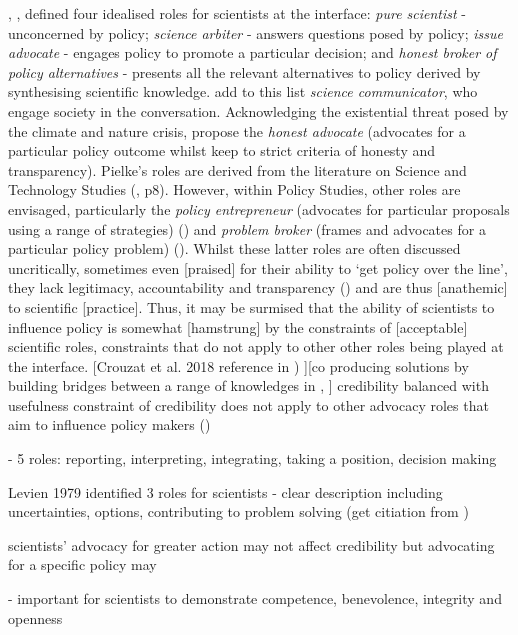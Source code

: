 , \textcite{Pielke2007}, defined four idealised roles for scientists at the interface: \emph{pure scientist} - unconcerned by policy; \emph{science arbiter} - answers questions posed by policy; \emph{issue advocate} - engages policy to promote a particular decision; and \emph{honest broker of policy alternatives} - presents all the relevant alternatives to policy derived by synthesising scientific knowledge. \textcite{RapleyD2014} add to this list \emph{science communicator}, who engage society in the conversation. Acknowledging the existential threat posed by the climate and nature crisis, \textcite{GregoryBW2024} propose the \emph{honest advocate} (advocates for a particular policy outcome whilst keep to strict criteria of honesty and transparency).  Pielke's roles are derived from the literature on Science and Technology Studies (\cite{Pielke2007}, p8). However, within Policy Studies, other roles are envisaged, particularly the \emph{policy entrepreneur} (advocates for particular proposals using a range of strategies) (\cite{Kingdon1993,Cairney2018}) and \emph{problem broker} (frames and advocates for a particular policy problem) (\cite{Knaggard2015}). Whilst these latter roles are often discussed uncritically, sometimes even [praised] for their ability to `get policy over the line', they lack legitimacy, accountability and transparency (\cite{vonMalmborg2024strategies}) and are thus [anathemic] to scientific [practice]. Thus, it may be surmised that the ability of scientists to influence policy is somewhat [hamstrung] by the constraints of [acceptable] scientific roles, constraints that do not apply to other other roles being played at the interface. [Crouzat et al. 2018 reference in \cite{BalvaneraJNOBCDGGKKMPSSW2020}) ][co producing solutions by building bridges between a range of knowledges \cite{NorstromEtAl2020} in \cite{BalvaneraJNOBCDGGKKMPSSW2020}, \cite{MatukBSAHT2020}]
credibility balanced with usefulness \cite{WesselinkH2020}
constraint of credibility does not apply to other advocacy roles that aim to influence policy makers (\cite{Kingdon1993,Knaggard2015,Cairney2018,vonMalmborg2024strategies})

\cite{SteelLLS2004,SinghTKMMC2014} - 5 roles: reporting, interpreting, integrating, taking a position, decision making

Levien 1979 identified 3 roles for scientists - clear description including uncertainties, options, contributing to problem solving (get citiation from \cite{SteelLLS2004})

\cite{ColognaKMBMO2024} scientists' advocacy for greater action may not affect credibility but advocating for a specific policy may

\cite{ColognaKMBMO2024} - important for scientists to demonstrate competence, benevolence, integrity and openness



